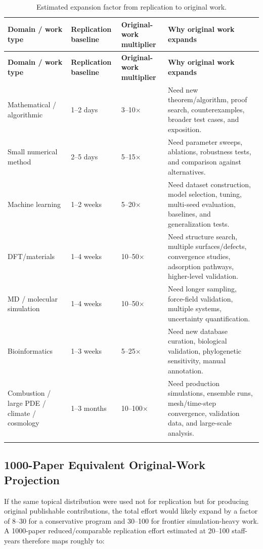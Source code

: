 \documentclass[11pt,letterpaper]{article}
\begin{document}
\begin{longtable}{p{3.7cm}p{3.0cm}p{3.0cm}p{6.0cm}}
\toprule
\textbf{Domain / work type} & \textbf{Replication baseline} & \textbf{Original-work multiplier} & \textbf{Why original work expands} \\
\midrule
\endfirsthead
\toprule
\textbf{Domain / work type} & \textbf{Replication baseline} & \textbf{Original-work multiplier} & \textbf{Why original work expands} \\
\midrule
\endhead
Mathematical / algorithmic & 1--2 days & 3--10$\times$ & Need new theorem/algorithm, proof search, counterexamples, broader test cases, and exposition. \\
\addlinespace
Small numerical method & 2--5 days & 5--15$\times$ & Need parameter sweeps, ablations, robustness tests, and comparison against alternatives. \\
\addlinespace
Machine learning & 1--2 weeks & 5--20$\times$ & Need dataset construction, model selection, tuning, multi-seed evaluation, baselines, and generalization tests. \\
\addlinespace
DFT/materials & 1--4 weeks & 10--50$\times$ & Need structure search, multiple surfaces/defects, convergence studies, adsorption pathways, higher-level validation. \\
\addlinespace
MD / molecular simulation & 1--4 weeks & 10--50$\times$ & Need longer sampling, force-field validation, multiple systems, uncertainty quantification. \\
\addlinespace
Bioinformatics & 1--3 weeks & 5--25$\times$ & Need new database curation, biological validation, phylogenetic sensitivity, manual annotation. \\
\addlinespace
Combustion / large PDE / climate / cosmology & 1--3 months & 10--100$\times$ & Need production simulations, ensemble runs, mesh/time-step convergence, validation data, and large-scale analysis. \\
\bottomrule
\caption{Estimated expansion factor from replication to original work.}
\end{longtable}

\subsection{1000-Paper Equivalent Original-Work Projection}

If the same topical distribution were used not for replication but for producing original publishable contributions, the total effort would likely expand by a factor of 8--30 for a conservative program and 30--100 for frontier simulation-heavy work. A 1000-paper reduced/comparable replication effort estimated at 20--100 staff-years therefore maps roughly to:
\end{document}
